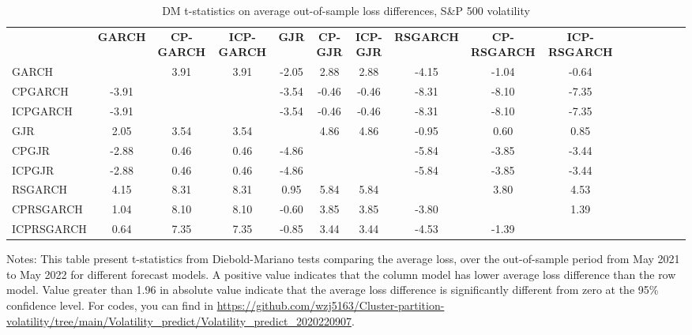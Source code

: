 \documentclass[preprint,12pt,authoryear]{elsarticle}
\begin{document}
\begin{table}
\begin{center}
\begin{threeparttable}
\centering \footnotesize
\caption{\footnotesize DM t-statistics on average out-of-sample loss differences, S\&P 500 volatility}\label{tab38}
\begin{tabular}{l c c c c c c c c c c c c c c c}
\toprule
 & \textbf{GARCH} & \textbf{CP-GARCH} & \textbf{ICP-GARCH} & \textbf{GJR} & \textbf{CP-GJR} & \textbf{ICP-GJR}& \textbf{RSGARCH} & \textbf{CP-RSGARCH} & \textbf{ICP-RSGARCH} \\
\cmidrule{2-10}
GARCH      &       & 3.91 & 3.91 & -2.05 &  2.88 &  2.88 & -4.15 & -1.04 & -0.64  \\
CPGARCH    & -3.91 &      &      & -3.54 & -0.46 & -0.46 & -8.31 & -8.10 & -7.35\\
ICPGARCH   & -3.91 &      &      & -3.54 & -0.46 & -0.46 & -8.31 & -8.10 & -7.35 \\
GJR        &  2.05 & 3.54 & 3.54 &       &  4.86 &  4.86 & -0.95 &  0.60 &  0.85\\
CPGJR      & -2.88 & 0.46 & 0.46 & -4.86 &       &       & -5.84 & -3.85 & -3.44 \\
ICPGJR     & -2.88 & 0.46 & 0.46 & -4.86 &       &       & -5.84 & -3.85 & -3.44 \\
RSGARCH    &  4.15 & 8.31 & 8.31 &  0.95 &  5.84 &  5.84 &       &  3.80 &  4.53   \\
CPRSGARCH  &  1.04 & 8.10 & 8.10 & -0.60 &  3.85 &  3.85 & -3.80 &       &  1.39 \\
ICPRSGARCH &  0.64 & 7.35 & 7.35 & -0.85 &  3.44 &  3.44 & -4.53 & -1.39 &         \\
\bottomrule
\end{tabular}
Notes: This table present t-statistics from Diebold-Mariano tests comparing the average loss, over the out-of-sample period from May 2021 to May 2022 for different forecast models. A positive value indicates that the column model has lower average loss difference than the row model. Value greater than 1.96 in absolute value indicate that the average loss difference is significantly different from zero at the 95\% confidence level.
For codes, you can find in
\url{https://github.com/wzj5163/Cluster-partition-volatility/tree/main/Volatility_predict/Volatility_predict_2020220907}.
\end{threeparttable}
\end{center}
\end{table}
\end{document}
